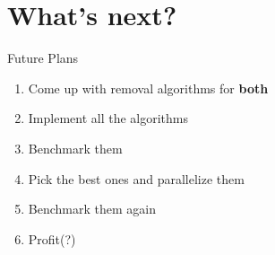 \section{What's next?}

\begin{frame}{Future Plans}
    \begin{enumerate}
        \item Come up with removal algorithms for \textbf{both}
        \item Implement all the algorithms
        \item Benchmark them
        \item Pick the best ones and parallelize them
        \item Benchmark them again
        \item Profit(?)
    \end{enumerate}
\end{frame}
